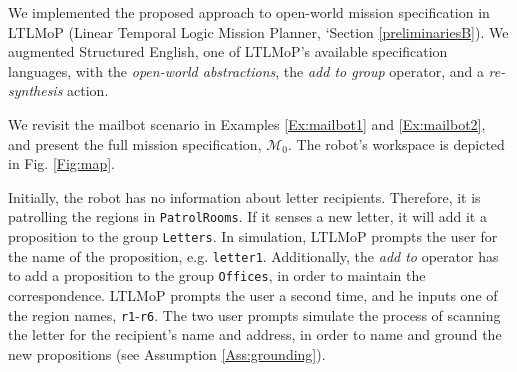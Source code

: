 We implemented the proposed approach to open-world mission specification in LTLMoP (Linear Temporal Logic Mission Planner, `Section \ref{preliminariesB}). We augmented Structured English, one of LTLMoP's available specification languages, with the \emph{open-world abstractions}, the \emph{add to group} operator, and a \emph{re-synthesis} action.

\begin{myExample}\label{Ex:mailbot3} We revisit the mailbot scenario in Examples \ref{Ex:mailbot1} and \ref{Ex:mailbot2}, and present the full mission specification, $\mathcal{M}_0$. The robot's workspace is depicted in Fig. \ref{Fig:map}.
\end{myExample}

Initially, the robot has no information about letter recipients. Therefore, it is patrolling the regions in \texttt{PatrolRooms}. If it senses a new letter, it will add it a proposition to the group \texttt{Letters}. In simulation, LTLMoP prompts the user for the name of the proposition, e.g. \texttt{letter1}. Additionally, the \emph{add to} operator has to add a proposition to the group \texttt{Offices}, in order to maintain the correspondence. LTLMoP prompts the user a second time, and he inputs one of the region names, \texttt{r1}-\texttt{r6}. The two user prompts simulate the process of scanning the letter for the recipient's name and address, in order to name and ground the new propositions (see Assumption \ref{Ass:grounding}).

